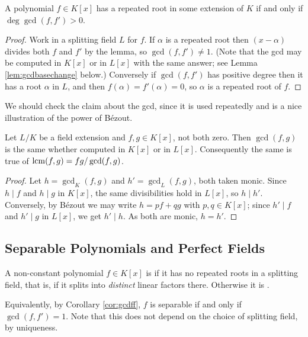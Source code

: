 \documentclass[a4paper]{scrartcl}
\begin{document}
\begin{corollary}\label{cor:gcdff}
	A polynomial $f \in K[x]$ has a repeated root in some extension of $K$ if and only if $\deg\gcd(f,f') > 0$.
\end{corollary}

\begin{proof}
	Work in a splitting field $L$ for $f$. If $\alpha$ is a repeated root then $(x-\alpha)$ divides both $f$ and $f'$ by the lemma, so $\gcd(f,f') \neq 1$. (Note that the gcd may be computed in $K[x]$ or in $L[x]$ with the same answer; see Lemma \ref{lem:gcdbasechange} below.) Conversely if $\gcd(f,f')$ has positive degree then it has a root $\alpha$ in $L$, and then $f(\alpha) = f'(\alpha) = 0$, so $\alpha$ is a repeated root of $f$.
\end{proof}

We should check the claim about the gcd, since it is used repeatedly and is a nice illustration of the power of B\'ezout.

\begin{lemma}\label{lem:gcdbasechange}
	Let $L/K$ be a field extension and $f, g \in K[x]$, not both zero. Then $\gcd(f,g)$ is the same whether computed in $K[x]$ or in $L[x]$. Consequently the same is true of $\operatorname{lcm}(f,g) = fg/\gcd(f,g)$.
\end{lemma}

\begin{proof}
	Let $h = \gcd_K(f,g)$ and $h' = \gcd_L(f,g)$, both taken monic. Since $h \mid f$ and $h \mid g$ in $K[x]$, the same divisibilities hold in $L[x]$, so $h \mid h'$. Conversely, by B\'ezout we may write $h = pf + qg$ with $p, q \in K[x]$; since $h' \mid f$ and $h' \mid g$ in $L[x]$, we get $h' \mid h$. As both are monic, $h = h'$.
\end{proof}

\subsection{Separable Polynomials and Perfect Fields}

\begin{definition}
	A non-constant polynomial $f \in K[x]$ is  if it has no repeated roots in a splitting field, that is, if it splits into \emph{distinct} linear factors there. Otherwise it is .
\end{definition}

Equivalently, by Corollary \ref{cor:gcdff}, $f$ is separable if and only if $\gcd(f,f') = 1$. Note that this does not depend on the choice of splitting field, by uniqueness.
\end{document}
